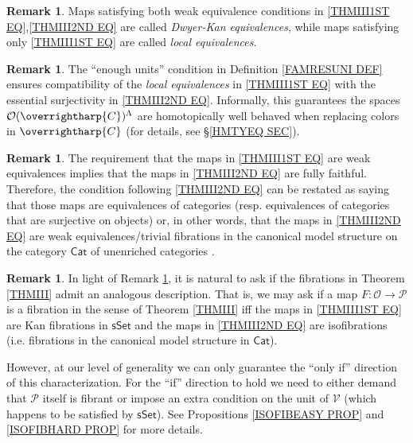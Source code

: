 \documentclass[a4paper,10pt
,draft
]{article}%
\numberwithin{equation}{section}
\numberwithin{figure}{section}
\theoremstyle{definition} %
\newtheorem{remark}[equation]{Remark}%
\newcommand{\vect}[1]{\text{\overrightharp{\ensuremath{#1}}}}
\newcommand{\V}{\ensuremath{\mathcal V}}
\renewcommand{\O}{\ensuremath{\mathcal O}}
\renewcommand{\P}{\ensuremath{\mathcal P}}
\newcommand{\1}{\ensuremath{\mathbbm 1}}%
\begin{document}
\begin{remark}
	Maps satisfying both weak equivalence conditions in 
	\eqref{THMIII1ST EQ},\eqref{THMIII2ND EQ}
	are called \emph{Dwyer-Kan equivalences},
	while maps satisfying only \eqref{THMIII1ST EQ}
	are called \emph{local equivalences}.
\end{remark}


\begin{remark}\label{WHYEU REM}
The ``enough units'' condition in Definition \ref{FAMRESUNI DEF}
ensures compatibility of the \emph{local equivalences}
in \eqref{THMIII1ST EQ}
with the essential surjectivity in	\eqref{THMIII2ND EQ}.
%
Informally, this guarantees the spaces 
$\O(\vect{C})^{\Lambda}$
are homotopically well behaved when replacing colors 
in $\vect{C}$
(for details, see \S \ref{HMTYEQ SEC}).
\end{remark}




\begin{remark}\label{WETRFCAN REM}
The requirement that the maps in 
\eqref{THMIII1ST EQ}
are weak equivalences implies that the maps in
\eqref{THMIII2ND EQ}
are fully faithful.
Therefore, the condition following \eqref{THMIII2ND EQ}
can be restated as saying that those maps are
equivalences of categories (resp. equivalences of categories that are surjective on objects) or, in other words,
that the maps in \eqref{THMIII2ND EQ}
are weak equivalences/trivial fibrations in the canonical model structure on the category $\mathsf{Cat}$ of unenriched categories
\cite{Rez}.
\end{remark}




\begin{remark}\label{FIBSALT REM}
	In light of Remark \ref{WETRFCAN REM}, 
	it is natural to ask if the fibrations in Theorem \ref{THMIII}
	admit an analogous description.
	That is, we may ask if a map $F\colon \O \to \mathcal{P}$
	is a fibration in the sense of Theorem \ref{THMIII}
	iff the maps in 
	\eqref{THMIII1ST EQ}
	are Kan fibrations in $\mathsf{sSet}$
	and the maps in
	\eqref{THMIII2ND EQ}
	are isofibrations (i.e. fibrations in the canonical model structure in $\mathsf{Cat}$).
	
	However, at our level of generality we can only guarantee the 
	``only if'' direction of this characterization.
	For the ``if'' direction to hold we need to either demand
	that $\P$ itself is fibrant or
	impose an extra condition on the unit of $\V$ (which happens to be satisfied by $\mathsf{sSet}$).
	See Propositions \ref{ISOFIBEASY PROP} and \ref{ISOFIBHARD PROP} for more details.
\end{remark}
\end{document}
